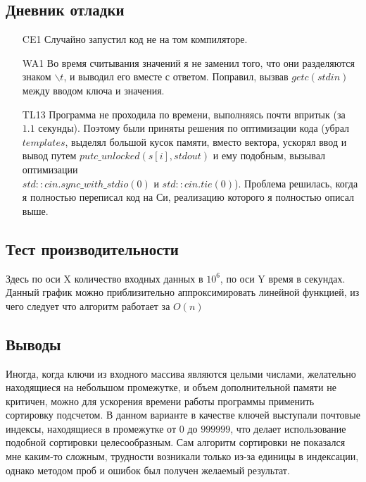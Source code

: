 \documentclass[12pt]{article}
\begin{document}
	\subsection*{Дневник отладки}
	
	\begin{enumerate}
		\item[CE1] Случайно запустил код не на том компиляторе.
		\item[WA1] Во время считывания значений я не заменил того, что они разделяются знаком $\backslash t$, и выводил его вместе с ответом. Поправил, вызвав $getc(stdin)$ между вводом ключа и значения.
		\item[TL13] Программа не проходила по времени, выполняясь почти впритык (за $1.1$ секунды). Поэтому были приняты решения по оптимизации кода (убрал $templates$, выделял большой кусок памяти, вместо вектора, ускорял ввод и вывод путем $putc\_unlocked(s[i], stdout)$ и ему подобным, вызывал оптимизации \\ $std::cin.sync\_with\_stdio(0)$ и $std::cin.tie(0)$). Проблема решилась, когда я полностью переписал код на Си, реализацию которого я полностью описал выше.
	\end{enumerate}
	
	\subsection*{Тест производительности}
	
	
	Здесь по оси X количество входных данных в $10^6$, по оси Y время в секундах. Данный график можно приблизительно аппроксимировать линейной функцией, из чего следует что алгоритм работает за $O(n)$
	 
	\subsection*{Выводы}
	
	Иногда, когда ключи из входного массива являются целыми числами, желательно находящиеся на небольшом промежутке, и объем дополнительной памяти не критичен, можно для ускорения времени работы программы применить сортировку подсчетом. В данном варианте в качестве ключей выступали почтовые индексы, находящиеся в промежутке от $0$ до $999999$, что делает использование подобной сортировки целесообразным. Сам алгоритм сортировки не показался мне каким-то сложным, трудности возникали только из-за единицы в индексации, однако методом проб и ошибок был получен желаемый результат.
	
\end{document}
